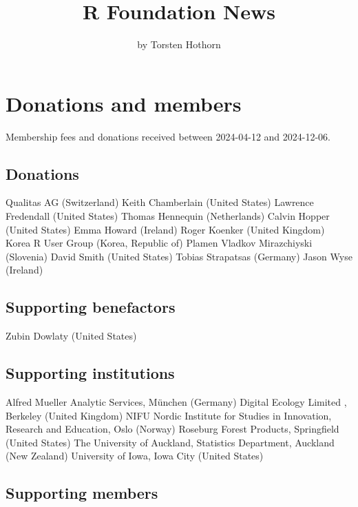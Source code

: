 \title{R Foundation News}


\author{by Torsten Hothorn}

\maketitle


\section{Donations and members}\label{donations-and-members}

Membership fees and donations received between
2024-04-12 and 2024-12-06.

\subsection{Donations}\label{donations}

Qualitas AG (Switzerland)
Keith Chamberlain (United States)
Lawrence Fredendall (United States)
Thomas Hennequin (Netherlands)
Calvin Hopper (United States)
Emma Howard (Ireland)
Roger Koenker (United Kingdom)
Korea R User Group (Korea, Republic of)
Plamen Vladkov Mirazchiyski (Slovenia)
David Smith (United States)
Tobias Strapatsas (Germany)
Jason Wyse (Ireland)

\subsection{Supporting benefactors}\label{supporting-benefactors}

Zubin Dowlaty (United States)

\subsection{Supporting institutions}\label{supporting-institutions}

Alfred Mueller Analytic Services, München (Germany)
Digital Ecology Limited , Berkeley (United Kingdom)
NIFU Nordic Institute for Studies in Innovation, Research and Education, Oslo (Norway)
Roseburg Forest Products, Springfield (United States)
The University of Auckland, Statistics Department, Auckland (New Zealand)
University of Iowa, Iowa City (United States)

\subsection{Supporting members}\label{supporting-members}

